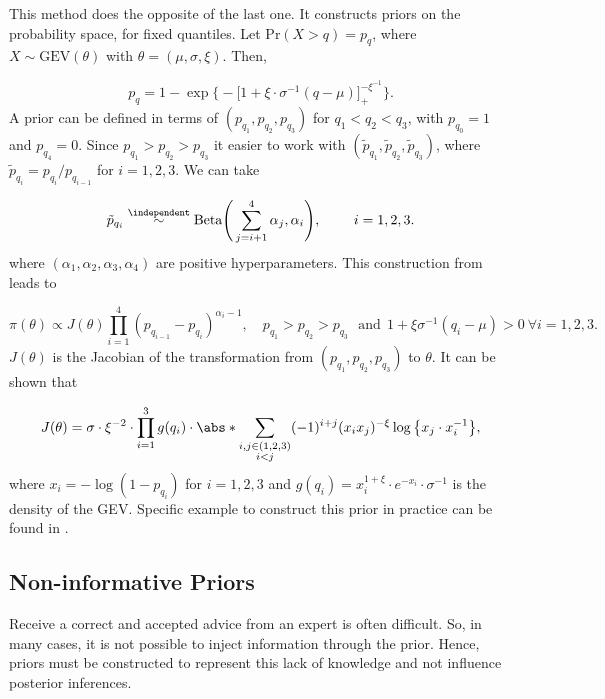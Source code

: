 This method does the opposite of the last one. It constructs priors on the
probability space, for fixed quantiles.
 Let $\text{Pr}(X>q)=p_q$, where $X\sim \text{GEV}(\theta)$ with $\theta=(\mu,\sigma,\xi)$. Then, 

\begin{equation*}
p_q=1-\exp\bigg\{-\Big[1+\xi\cdot\sigma^{-1}(q-\mu)\Big]_+^{-\xi^{-1}}\bigg\}.
\end{equation*}
A prior can be defined in terms of $(p_{q_1},p_{q_2},p_{q_3})$ for $q_1<q_2<q_3$, with $p_{q_0}=1$ and $p_{q_4}=0$. Since $p_{q_1}>p_{q_2}>p_{q_3}$ it easier to work with $(\tilde{p}_{q_1},\tilde{p}_{q_2},\tilde{p}_{q_3})$, where $\tilde{p}_{q_i}=p_{q_i}/p_{q_{i-1}}$ for $i=1,2,3$. We can take 

\begin{equation}
\tilde{p}_{q_i}\stackrel{\independent}{\sim}\text{Beta}\Bigg(\sum_{j=i+1}^4 \alpha_j,\alpha_i\Bigg), \qquad \ i=1,2,3.
\end{equation}
where $(\alpha_1,\alpha_2,\alpha_3,\alpha_4)$ are positive hyperparameters.
This construction from \citet{Crowder1992} leads to 

\begin{equation*}
\pi(\theta)\propto J(\theta)\prod_{i=1}^4(p_{q_{i-1}}-p_{q_i})^{\alpha_i-1}, \quad  p_{q_1}>p_{q_2}>p_{q_3} \ \ \ \text{and} \ \ 1+\xi\sigma^{-1}(q_i-\mu)>0 \ \forall i=1,2,3.
\end{equation*}
$J(\theta)$ is the Jacobian of the transformation from $(p_{q_1}, p_{q_2},p_{q_3})$ to $\theta$. It can be shown that 

\begin{equation}
J(\theta)=\sigma\cdot\xi^{-2}\cdot\prod_{i=1}^3g(q_i)\cdot \abs*{\sum_{\substack{i,j\in(1,2,3) \\ i<j}} (-1)^{i+j} (x_ix_j)^{-\xi} \log\big\{x_j\cdot x_i^{-1}\big\}},
\end{equation}
where $x_i=-\log(1-p_{q_i})$ for $i=1,2,3$ and $g(q_i)=x_i^{1+\xi}\cdot e^{-x_i}\cdot\sigma^{-1}$
is the density of the GEV.
Specific example to construct this prior in practice can be found in \citet[pp.272]{dey_extreme_2016}.

\subsection{Non-informative Priors}\label{sec:noninfoprior}

Receive a correct and accepted advice from an expert is often difficult.
So, in many cases, it is not possible to inject information through the prior. 
Hence, priors must be constructed to represent this lack of knowledge and not influence posterior inferences. 

